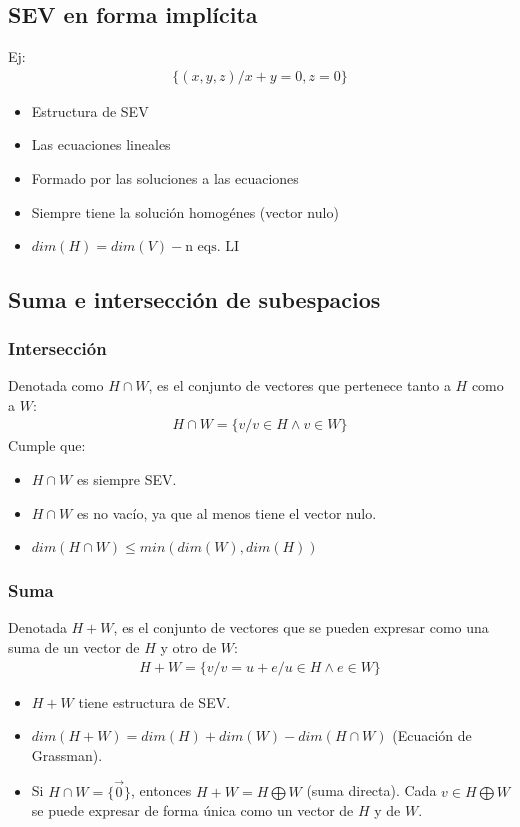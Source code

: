 \documentclass{article}
\begin{document}
\subsection{SEV en forma implícita}
Ej:
\begin{equation}
    \begin{split}
        \{ (x,y,z) / x+y = 0, z=0 \}
    \end{split}
\end{equation}
\begin{itemize}
    \item Estructura de SEV
    \item Las ecuaciones lineales
    \item Formado por las soluciones a las ecuaciones
    \item Siempre tiene la solución homogénes (vector nulo)
    \item $dim(H) = dim(V) - \text{n eqs. LI}$
\end{itemize}
\subsection{Suma e intersección de subespacios}
\subsubsection{Intersección}
Denotada como $H \cap W$, es el conjunto de vectores que pertenece tanto a $H$ como a $W$:
\begin{equation}
    \begin{split}
        H \cap W = \{ v / v \in H \wedge v \in W \}
    \end{split}
\end{equation}
Cumple que:
\begin{itemize}
    \item $H \cap W$ es siempre SEV.
    \item $H \cap W$ es no vacío, ya que al menos tiene el vector nulo.
    \item $dim(H \cap W) \leq min(dim (W),dim(H))$
\end{itemize}
\subsubsection{Suma}
Denotada $H+W$, es el conjunto de vectores que se pueden expresar como una suma de un vector de
$H$ y otro de $W$:
\begin{equation}
    \begin{split}
        H+W = \{ v / v = u + e / u \in H \wedge e \in W \}
    \end{split}
\end{equation}
\begin{itemize}
    \item $H+W$ tiene estructura de SEV.
    \item $dim(H+W)= dim(H) + dim(W) - dim(H \cap W)$ (Ecuación de Grassman).
    \item Si $H \cap W = \{ \vec{0} \}$, entonces $H+W = H \bigoplus W$ (suma directa).
    Cada $v \in H \bigoplus W$ se puede expresar de forma única como un vector de $H$ y de $W$.
\end{itemize}
\end{document}
